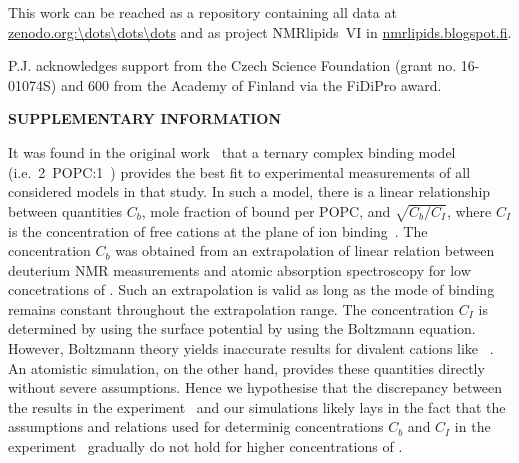 \documentclass[aip,jcp,twocolumn]{revtex4}
\begin{document}




This work can be reached as a repository containing all data at \url{zenodo.org:\dots\dots\dots} and as project \mbox{NMRlipids~VI} in \url{nmrlipids.blogspot.fi}.



\begin{acknowledgments}
P.J. acknowledges support from the Czech Science Foundation (grant no. 16-01074S) 
and 600 from the Academy of Finland via the FiDiPro award.
\end{acknowledgments}


\newpage
\newpage
\appendix


\begin{center}
{\bf SUPPLEMENTARY INFORMATION}
\end{center}

It was found in the original work~\cite{altenbach84} that 
a ternary complex binding model (i.e.~2~POPC:1~)
provides the best fit to experimental measurements of all considered models in that study. 
In such a model, there is a linear relationship between quantities 
$C_b$, mole fraction of bound  per POPC, and $\sqrt{C_b/C_I}$, 
where $C_I$ is the concentration of free cations at the plane of ion binding~\cite{altenbach84}.
The concentration $C_b$ was obtained from an extrapolation of linear relation 
between deuterium NMR measurements and atomic absorption spectroscopy for low concetrations of .
Such an extrapolation is valid as long as the mode of  binding 
remains constant throughout the extrapolation range. 
The concentration $C_I$ is determined by using the surface potential by using the Boltzmann equation.
However, Boltzmann theory yields inaccurate results
for divalent cations like ~\cite{Andelman1995}. 
An atomistic simulation, on the other hand, provides these quantities directly without severe assumptions.
Hence we hypothesise that the discrepancy between the results in the experiment~\cite{altenbach84} and 
our simulations likely lays in the fact that 
the assumptions and relations used for determinig concentrations $C_b$ and $C_I$ in the experiment~\cite{altenbach84}
gradually do not hold for higher concentrations of . 
\end{document}
